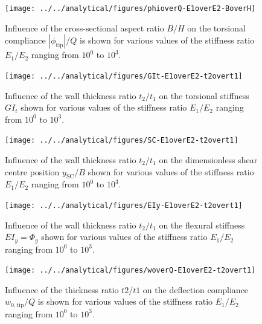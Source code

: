 \begin{figure}[!htpb] %
  \centering
  \texttt{[image: ../../analytical/figures/phioverQ-E1overE2-BoverH]}
  \caption[Influence of the cross-sectional aspect ratio $B/H$ on the torsional compliance]{Influence of the cross-sectional aspect ratio $B/H$ on the torsional compliance $|\phi_{\mathrm{tip}}| / Q$ is shown for various values of the stiffness ratio $E_1/E_2$ ranging from $10^0$ to $10^3$. }\label{fig:phioverQ-E1overE2-BoverH}
\end{figure}

\begin{figure}[!htpb] %
  \centering
  \texttt{[image: ../../analytical/figures/GIt-E1overE2-t2overt1]}
  \caption[Influence of the wall thickness ratio $t_2/t_1$ on the torsional stiffness $GI_t$]{Influence of the wall thickness ratio $t_2/t_1$ on the torsional stiffness $GI_t$ shown for various values of the stiffness ratio $E_1/E_2$ ranging from $10^0$ to $10^3$. }\label{fig:GIt-E1overE2-t2overt1}
\end{figure}

\begin{figure}[!htpb] %
  \centering
  \texttt{[image: ../../analytical/figures/SC-E1overE2-t2overt1]}
  \caption[Influence of the wall thickness ratio $t_2/t_1$ on the dimensionless shear centre position $y_{\mathrm{SC}}/B$]{Influence of the wall thickness ratio $t_2/t_1$ on the dimensionless shear centre position $y_{\mathrm{SC}}/B$ shown for various values of the stiffness ratio $E_1/E_2$ ranging from $10^0$ to $10^3$. }\label{fig:SC-E1overE2-t2overt1}
\end{figure}

\begin{figure}[!htpb] %
  \centering
  \texttt{[image: ../../analytical/figures/EIy-E1overE2-t2overt1]}
  \caption[Influence of the wall thickness ratio $t_2/t_1$ on the flexural stiffness $EI_y$]{Influence of the wall thickness ratio $t_2/t_1$ on the flexural stiffness $EI_y = \Phi_y$ shown for various values of the stiffness ratio $E_1/E_2$ ranging from $10^0$ to $10^3$. }\label{fig:EIy-E1overE2-t2overt1}
\end{figure}

\begin{figure}[!htpb] %
  \centering
  \texttt{[image: ../../analytical/figures/woverQ-E1overE2-t2overt1]}
  \caption[Influence of the thickness ratio $t2/t1$ on the deflection compliance]{Influence of the thickness ratio $t2/t1$ on the deflection compliance $w_{\mathrm{0,tip}} / Q$ is shown for various values of the stiffness ratio $E_1/E_2$ ranging from $10^0$ to $10^3$. }\label{fig:woverQ-E1overE2-t2overt1}
\end{figure}

